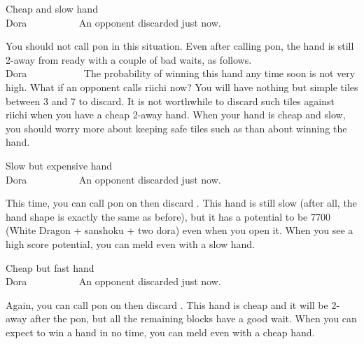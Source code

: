 \begin{itembox}[r]{Cheap and slow hand}
\bp
{}\bai\bai~~\\
\hfill\footnotesize{{\jap Dora}~~~~~~~~~~}
\ep
\vspace{-20pt}An opponent discarded {\LARGE\bai} just now.
\end{itembox}
You should not call {\jap pon} in this situation. Even after calling {\jap pon}, the hand is still 2-away from ready with a couple of bad waits, as follows.
\bp
{}~\rbai\bai\bai~~\\
\hfill\footnotesize{{\jap Dora}~~~~~~~~~~~}
\ep
The probability of winning this hand any time soon is not very high. What if an opponent calls riichi now? You will have nothing but simple tiles between 3 and 7 to discard. It is not worthwhile to discard such tiles against riichi when you have a cheap 2-away hand. When your hand is cheap and slow, you should worry more about keeping safe tiles such as {\LARGE\bai} than about winning the hand.

\vfill
\begin{itembox}[r]{Slow but expensive hand}
\bp
{}\bai\bai~~\\
\hfill\footnotesize{{\jap Dora}~~~~~~~~~~}
\ep
\vspace{-20pt}An opponent discarded {\LARGE\bai} just now.
\end{itembox}
This time, you can call {\jap pon} on {\LARGE\bai} then discard {\LARGE{}}. This hand is still slow (after all, the hand shape is exactly the same as before), but it has a potential to be 7700 (White Dragon + {\jap sanshoku} + two {\jap dora}) even when you open it. When you see a high score potential, you can meld even with a slow hand. 

\bigskip
\begin{itembox}[r]{Cheap but fast hand}
\bp
{}\bai\bai~~\\
\hfill\footnotesize{{\jap Dora}~~~~~~~~~~}
\ep
\vspace{-20pt}An opponent discarded {\LARGE\bai} just now.
\end{itembox}
Again, you can call {\jap pon} on {\LARGE\bai} then discard {\LARGE{}}. This hand is cheap and it will be 2-away after the {\jap pon}, but all the remaining blocks have a good wait. When you can expect to win a hand in no time, you can meld even with a cheap hand. 

